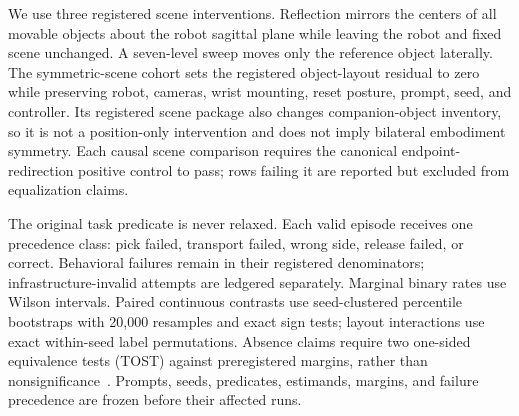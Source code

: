We use three registered scene interventions. Reflection mirrors the centers of all movable objects about the robot sagittal plane while leaving the robot and fixed scene unchanged. A seven-level sweep moves only the reference object laterally. The symmetric-scene cohort sets the registered object-layout residual to zero while preserving robot, cameras, wrist mounting, reset posture, prompt, seed, and controller. Its registered scene package also changes companion-object inventory, so it is not a position-only intervention and does not imply bilateral embodiment symmetry. Each causal scene comparison requires the canonical endpoint-redirection positive control to pass; rows failing it are reported but excluded from equalization claims.

The original task predicate is never relaxed. Each valid episode receives one precedence class: pick failed, transport failed, wrong side, release failed, or correct. Behavioral failures remain in their registered denominators; infrastructure-invalid attempts are ledgered separately. Marginal binary rates use Wilson intervals. Paired continuous contrasts use seed-clustered percentile bootstraps with 20,000 resamples and exact sign tests; layout interactions use exact within-seed label permutations. Absence claims require two one-sided equivalence tests (TOST) against preregistered margins, rather than nonsignificance~\cite{wilson1927interval,efron1994bootstrap,schuirmann1987tost}. Prompts, seeds, predicates, estimands, margins, and failure precedence are frozen before their affected runs.
